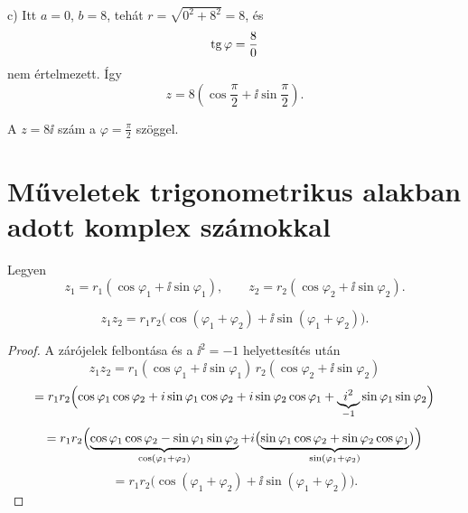 \documentclass[11pt]{article}
\begin{document}
\begin{solution}
c) Itt $a=0$, $b=8$, tehát $r=\sqrt{0^{2}+8^{2}}=8$, és
\[
\operatorname{tg}\varphi=\frac{8}{0}
\]
nem értelmezett. Így
\[
z=8\left(\cos\frac{\pi}{2}+\ii\sin\frac{\pi}{2}\right).
\]

\begin{notefig}{A $z=8\ii$ szám a $\varphi=\frac{\pi}{2}$ szöggel.}
\end{notefig}
\end{solution}

\section{Műveletek trigonometrikus alakban adott komplex számokkal}

Legyen
\[
z_{1}=r_{1}(\cos\varphi_{1}+\ii\sin\varphi_{1}),\qquad
z_{2}=r_{2}(\cos\varphi_{2}+\ii\sin\varphi_{2}).
\]

\begin{thmbox}
\begin{proposition}
\begin{equation}\label{eq:polszorzat}
z_{1}z_{2}=r_{1}r_{2}\bigl(\cos(\varphi_{1}+\varphi_{2})+\ii\sin(\varphi_{1}+\varphi_{2})\bigr).
\end{equation}
\end{proposition}
\end{thmbox}
\begin{proof}
A zárójelek felbontása és a $\ii^{2}=-1$ helyettesítés után
\[
z_{1}z_{2}=r_{1}(\cos\varphi_{1}+\ii\sin\varphi_{1})\,r_{2}(\cos\varphi_{2}+\ii\sin\varphi_{2})
\]
\[
=r_{1}r_{2}\Bigl(\cos\varphi_{1}\cos\varphi_{2}+i\sin\varphi_{1}\cos\varphi_{2}
+i\sin\varphi_{2}\cos\varphi_{1}+\underbrace{i^{2}}_{-1}\sin\varphi_{1}\sin\varphi_{2}\Bigr)
\]
\[
=r_{1}r_{2}\Bigl(
\underbrace{\cos\varphi_{1}\cos\varphi_{2}-\sin\varphi_{1}\sin\varphi_{2}}_{\cos(\varphi_{1}+\varphi_{2})}
+i\bigl(\underbrace{\sin\varphi_{1}\cos\varphi_{2}+\sin\varphi_{2}\cos\varphi_{1}}_{\sin(\varphi_{1}+\varphi_{2})}\bigr)\Bigr)
\]
\[
=r_{1}r_{2}\bigl(\cos(\varphi_{1}+\varphi_{2})+\ii\sin(\varphi_{1}+\varphi_{2})\bigr).
\]
\end{proof}
\end{document}
